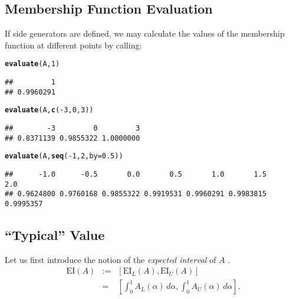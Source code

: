 \documentclass[11pt]{article}\usepackage[]{graphicx}\usepackage[]{color}
\makeatletter
\newcommand{\hlnum}[1]{\textcolor[rgb]{0.686,0.059,0.569}{#1}}%
\newcommand{\hlopt}[1]{\textcolor[rgb]{0,0,0}{#1}}%
\newcommand{\hlstd}[1]{\textcolor[rgb]{0.345,0.345,0.345}{#1}}%
\newcommand{\hlkwc}[1]{\textcolor[rgb]{0.333,0.667,0.333}{#1}}%
\newcommand{\hlkwd}[1]{\textcolor[rgb]{0.737,0.353,0.396}{\textbf{#1}}}%
\newenvironment{kframe}{%
 \def\at@end@of@kframe{}%
 \ifinner\ifhmode%
  \def\at@end@of@kframe{\end{minipage}}%
  \begin{minipage}{\columnwidth}%
 \fi\fi%
 \def\FrameCommand##1{\hskip\@totalleftmargin \hskip-\fboxsep
 \colorbox{shadecolor}{##1}\hskip-\fboxsep
     \hskip-\linewidth \hskip-\@totalleftmargin \hskip\columnwidth}%
 \MakeFramed {\advance\hsize-\width
   \@totalleftmargin\z@ \linewidth\hsize
   \@setminipage}}%
 {\par\unskip\endMakeFramed%
 \at@end@of@kframe}
\newenvironment{knitrout}{}{} %
\makeatother
\begin{document}
\subsection{Membership Function Evaluation}

If side generators are defined, we may calculate
the values of the membership function at different points by calling:

\begin{knitrout}\small
{}\color{fgcolor}\begin{kframe}
\begin{alltt}
\hlkwd{evaluate}\hlstd{(A,} \hlnum{1}\hlstd{)}
\end{alltt}
\begin{verbatim}
##         1 
## 0.9960291
\end{verbatim}
\begin{alltt}
\hlkwd{evaluate}\hlstd{(A,} \hlkwd{c}\hlstd{(}\hlopt{-}\hlnum{3}\hlstd{,}\hlnum{0}\hlstd{,}\hlnum{3}\hlstd{))}
\end{alltt}
\begin{verbatim}
##        -3         0         3 
## 0.8371139 0.9855322 1.0000000
\end{verbatim}
\begin{alltt}
\hlkwd{evaluate}\hlstd{(A,} \hlkwd{seq}\hlstd{(}\hlopt{-}\hlnum{1}\hlstd{,} \hlnum{2}\hlstd{,} \hlkwc{by}\hlstd{=}\hlnum{0.5}\hlstd{))}
\end{alltt}
\begin{verbatim}
##      -1.0      -0.5       0.0       0.5       1.0       1.5       2.0 
## 0.9624800 0.9760168 0.9855322 0.9919531 0.9960291 0.9983815 0.9995357
\end{verbatim}
\end{kframe}
\end{knitrout}



\subsection{``Typical'' Value}


Let us first introduce the notion of the \textit{expected interval} of $A$
\cite{DuboisPrade1987:meanfn}.
\begin{eqnarray}
\mathrm{EI}(A) & := & [\mathrm{EI}_L(A), \mathrm{EI}_U(A)] \\
               & = & \left[ \int_0^1 A_L(\alpha)\,d\alpha, \int_0^1 A_U(\alpha)\,d\alpha \right].
\end{eqnarray}
\end{document}
